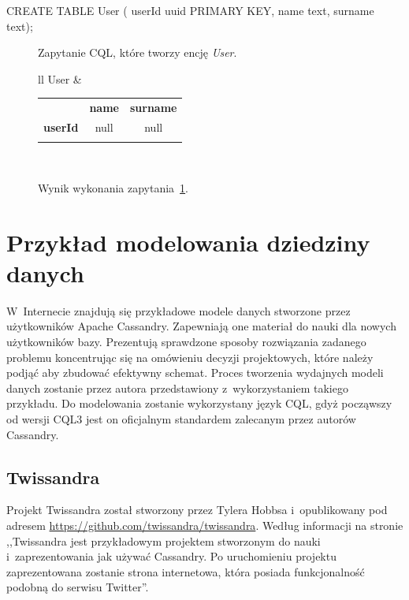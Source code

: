 \begin{verbbox}
	CREATE TABLE User (
	    userId uuid PRIMARY KEY,
	    name text,
	    surname text);
\end{verbbox}

\begin{figure}[ht!]
	\centering
	\theverbbox

	\caption{Zapytanie CQL, które tworzy encję \emph{User}.}
	\label{lst:cql_example}
\end{figure}

\begin{figure}[ht!]
	\centering

	\begin{tabular}{ll}
		User &
		\begin{tabular}{|l||c|c|}
			\hhline{|-||--|}
			 & \textbf{name} & \textbf{surname} \\
			\hhline{|~||==|}
			\textbf{userId} & null & null \\
			\hhline{|-||--|}
		\end{tabular} \\
	\end{tabular}

	\caption{Wynik wykonania zapytania~\ref{lst:cql_example}.}
	\label{tab:cql_example_query_result}
\end{figure}

\section{Przykład modelowania dziedziny danych}
\label{sec:cassandra_modelling_examples}

W~Internecie znajdują się przykładowe modele danych stworzone przez użytkowników Apache Cassandry. Zapewniają one materiał do nauki dla nowych użytkowników bazy. Prezentują sprawdzone sposoby rozwiązania zadanego problemu koncentrując się na omówieniu decyzji projektowych, które należy podjąć aby zbudować efektywny schemat. Proces tworzenia wydajnych modeli danych zostanie przez autora przedstawiony z~wykorzystaniem takiego przykładu. Do modelowania zostanie wykorzystany język CQL, gdyż począwszy od wersji CQL3 jest on oficjalnym standardem zalecanym przez autorów Cassandry. 

\subsection{Twissandra}
\label{sec:twissandra}

Projekt Twissandra został stworzony przez Tylera Hobbsa i~opublikowany pod adresem \url{https://github.com/twissandra/twissandra}. Według informacji na stronie ,,Twissandra jest przykładowym projektem stworzonym do nauki i~zaprezentowania jak używać Cassandry. Po uruchomieniu projektu zaprezentowana zostanie strona internetowa, która posiada funkcjonalność podobną do serwisu Twitter''.~\cite{twissandra} 

